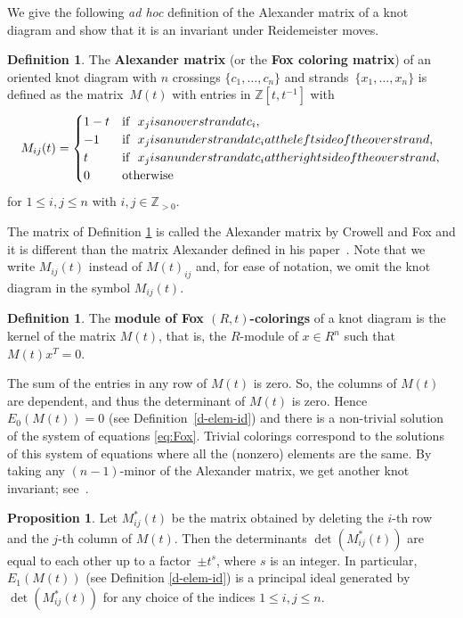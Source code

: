 \documentclass[11pt,a4paper]{article}
\theoremstyle{definition}
\newtheorem{proposition}[theorem]{Proposition}
\newtheorem{definition}[theorem]{Definition}
\newcommand{\numberset}{\mathbb}
\newcommand{\Z}{\numberset{Z}}
\begin{document}
We give the following \textit{ad hoc} definition of the Alexander matrix of a knot diagram and show that it is an invariant under Reidemeister moves.

\begin{definition}
\label{def:coloringMat}
The \textbf{Alexander matrix} (or the \textbf{Fox coloring matrix}) of an oriented knot diagram with $n$ crossings $\{c_1,\ldots,c_n\}$ and strands~$\{x_1,\ldots,x_n\}$ is defined as the 
matrix~$M(t)$ with entries in $\Z[t,t^{-1}]$ with
$$
M_{ij}(t) = 
\begin{cases}
1 - t & \text{if} \ \ x_j \textnormal{ is an overstrand at } c_i,\\
-1 & \text{if} \ \ x_j \textnormal{ is an understrand at } c_i \textnormal{ at the left side of the overstrand},\\
t & \text{if} \ \ x_j \textnormal{ is an understrand at } c_i \textnormal{ at the right side of the overstrand},\\
0 & \text{otherwise}
\end{cases}
$$ for $1 \le i,j \le n$ with $i,j \in \Z_{>0}.$
\end{definition}

The matrix of Definition \ref{def:coloringMat} is called the Alexander matrix by Crowell and Fox \cite{crowell2012introduction} and it is different than the matrix Alexander defined in his paper~\cite{alexander1928topological}. 
Note that we write $M_{ij}(t)$ instead of 
$M(t)_{ij}$ and, for ease 
of notation, we omit the knot diagram in the symbol $M_{ij}(t)$.

\begin{definition}
\label{def:Foxmodule}
The \textbf{module of Fox $(R,t)$-colorings} of a knot diagram is the kernel of the matrix $M(t)$, that is, the $R$-module of 
$x \in R^n$ such that $M(t) x^T=0$.
\end{definition}


The sum of the entries in any row of $M(t)$ is zero. So, the columns of $M(t)$ are dependent, and thus the determinant of $M(t)$ is zero. 
Hence $E_0(M(t))=0$ (see Definition~\ref{d-elem-id}) and there is a non-trivial solution of the system of equations \eqref{eq:Fox}. Trivial colorings correspond to the solutions of this system of equations where all the (nonzero) elements are the same. 
By taking any $(n-1)$-minor of the Alexander matrix, we get another knot invariant; see~\cite{alexander1928topological}. 


\begin{proposition}\label{p-pincipalM}
Let $M_{ij}^*(t)$ be the matrix obtained by deleting the $i$-th row and the $j$-th column of $M(t)$. 
Then the determinants $\det (M_{ij}^*(t))$ are equal to each other up to a factor~$\pm t^s$, where $s$ is an integer. 
In particular, $E_1(M(t))$ (see Definition \ref{d-elem-id}) is a principal ideal generated by $\det (M_{ij}^*(t))$ for any choice of the indices $1 \le i, j \le n$.
\end{proposition}
\end{document}
